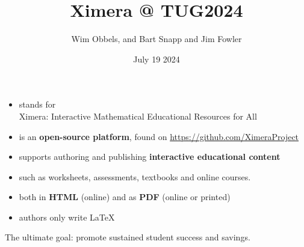 \usepackage{rawfonts}
%
%
%

\graphicspath{
	{../../}
	{../}
	{./}
  	{../../pictures/}
   	{../pictures/}
   	{./pictures/}
}

\title{Ximera @ TUG2024}
\author{Wim Obbels, and Bart Snapp and Jim Fowler}
\date{July 19 2024}




\begin{frame}
  \titlepage
\end{frame}

\begin{frame}[t]{\Large{}}
  \p
  \begin{itemize}[<+->]
  \item stands for \hfill {}
      \\[-0.5cm]
     {\Large\blue X}imera: {\Large\blue I}nteractive {\Large\blue M}athematical {\Large\blue E}ducational {\Large\blue R}esources for {\Large\blue A}ll
     \\[0.4cm]
  \item is an \textbf{open-source platform}, found on \url{https://github.com/XimeraProject}
  \item supports authoring and publishing \textbf{{\color{blue}interactive} educational content}
  \item such as worksheets, assessments, textbooks and online courses. 
  \item both in \textbf{HTML} (online) and as \textbf{PDF} (online or printed)
  \item authors only write \LaTeX %
  \end{itemize}
   
  \vfill

  \p The ultimate goal: promote sustained student success and savings.
  
  

\end{frame}


